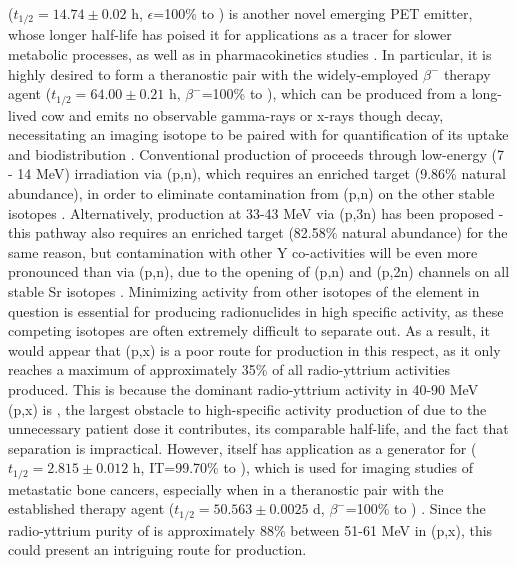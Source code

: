 \documentclass[3p]{elsarticle}
\begin{document}
 ($t_{1/2}=14.74\pm0.02$ h, $\epsilon$=100\% to   \cite{NEGRET20151}) is another novel  emerging  PET emitter, whose longer half-life has poised it for applications as a tracer for slower metabolic processes, as well as in   pharmacokinetics studies \cite{Nickles2003,Qaim2008,QaimSyedM2011}.
In particular, it is highly desired to form a theranostic pair with the widely-employed $\beta^-$ therapy agent  ($t_{1/2}=64.00\pm0.21$ h, $\beta^-$=100\% to  \cite{Browne1997}), which can be produced from a long-lived  cow and emits no observable gamma-rays or x-rays though decay, necessitating an imaging isotope to be paired with for quantification of its uptake and biodistribution  \cite{Herzog1993}.
Conventional production of  proceeds through low-energy (7 - 14 MeV) irradiation via (p,n), which requires an enriched   target (9.86\% natural abundance), in order to eliminate contamination from (p,n) on the other stable  isotopes  \cite{Rosch1993}.
Alternatively, production at 33-43 MeV via (p,3n) has been proposed - this pathway also requires an enriched target (82.58\% natural abundance) for the same reason, but contamination with other Y co-activities will be even more pronounced than via (p,n), due to the opening of (p,n) and (p,2n) channels on all stable Sr isotopes \cite{doi:10.1139/v67-193,levkovski1991cross}.
Minimizing activity from other isotopes of the element in question is essential for producing radionuclides in high specific activity, as these competing isotopes are often extremely difficult to separate out.
As a result, it would appear that (p,x) is a poor route for   production in this respect, as it only reaches a maximum of approximately 35\% of all radio-yttrium activities produced.
This is because the dominant radio-yttrium activity in 40-90 MeV (p,x) is  , the largest obstacle to high-specific activity production of   due to the unnecessary patient dose it contributes,  its comparable half-life, and the fact that separation is impractical.
However,   itself has application as a generator for   ($t_{1/2}=2.815\pm0.012$ h, IT=99.70\% to  \cite{Johnson2015}), which is used for imaging studies of metastatic bone cancers, especially when in a theranostic pair with the established therapy agent  ($t_{1/2}=50.563\pm0.0025$ d, $\beta^-$=100\% to  \cite{Singh2013}) \cite{Kiselev1974,Kandil2009}.
Since the radio-yttrium purity of  is approximately 88\% between 51-61 MeV in (p,x), this could present an intriguing route for   production.
\end{document}
